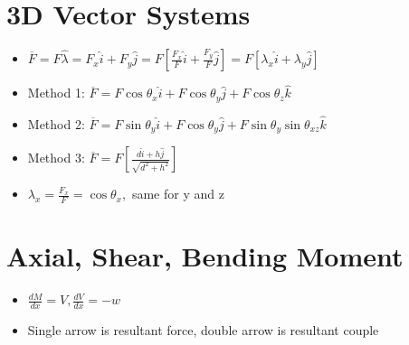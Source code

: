 \documentclass [10pt] {article}
\begin{document}
\begin{multicols*}{2}
\section{3D Vector Systems}
	\begin{itemize}
		\item $\overline{F} = F\hat{\lambda} = F_x\hat{i} + F_y\hat{j} = F[\frac{F_x}{F}\hat{i} + \frac{F_y}{F}\hat{j}]  = F[\lambda_x\hat{i} + \lambda_y\hat{j}] $
		\item Method 1: $ \overline{F} = F\cos\theta_x\hat{i} + F\cos\theta_y\hat{j} + F\cos\theta_z\hat{k} $
		\item Method 2: $ \overline{F} = F\sin\theta_y\hat{i} + F\cos\theta_y\hat{j} + F\sin\theta_y\sin\theta_{xz}\hat{k} $
		\item Method 3: $ \overline{F} = F[\frac{d\hat{i} + h\hat{j}}{\sqrt{d^2 + h^2}}] $
		\item $\lambda_x = \frac{F_x}{F} = \cos{\theta_x}, $ same for y and z 
	\end{itemize}
\section{Axial, Shear, Bending Moment}
	\begin{itemize}
		\item $\frac{dM}{dx} = V, \frac{dV}{dx} = -w$
		\item Single arrow is resultant force, double arrow is resultant couple \\\\\\\\
	\end{itemize}

\end{multicols*}
\end{document}
